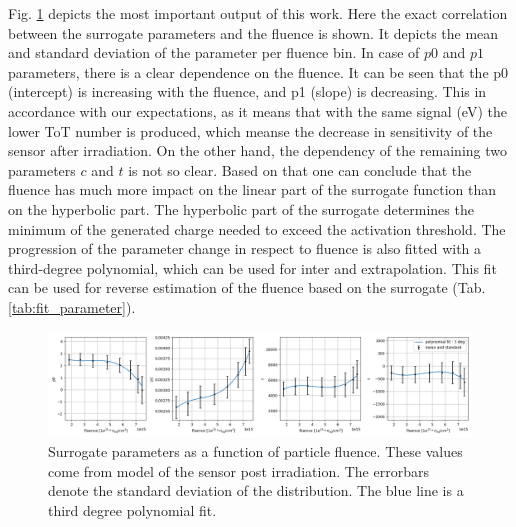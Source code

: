 Fig. \ref{fig:surrogate_fluence} depicts the most important output of this work. Here the exact correlation between the surrogate parameters and the fluence is shown. It depicts the mean and standard deviation of the parameter per fluence bin. In case of $p0$ and $p1$ parameters, there is a clear dependence on the fluence. It can be seen that the p0 (intercept) is increasing with the fluence, and p1 (slope) is decreasing.
This in accordance with our expectations, as it means that with the same signal (eV) the lower ToT number is produced, which meanse the decrease in sensitivity of the sensor after irradiation.
On the other hand, the dependency of the remaining two parameters $c$ and $t$ is not so clear.
Based on that one can conclude that the fluence has much more impact on the linear part of the surrogate function than on the hyperbolic part.
The hyperbolic part of the surrogate determines the minimum of the generated charge needed to exceed the activation threshold. 
The progression of the parameter change in respect to fluence is also fitted with a third-degree polynomial, which can be used for inter and extrapolation. This fit can be used for reverse estimation of the fluence based on the surrogate (Tab. \ref{tab:fit_parameter}).

\begin{figure}
\centering
\includegraphics[width=1.\textwidth]{figures/chapter4/surrogates/p3_pre_post_fluences.png}
\caption{Surrogate parameters as a function of particle fluence. These values come from model of the sensor post irradiation. The errorbars denote the standard deviation of the distribution. The blue line is a third degree polynomial fit.}
\label{fig:surrogate_fluence}
\end{figure}

